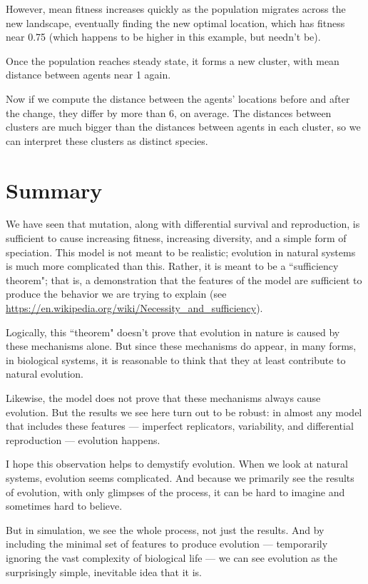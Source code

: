 \documentclass[12pt]{book}
\theoremstyle{exercise}
\begin{document}
However, mean fitness increases quickly as the population migrates across the new landscape, eventually finding the new optimal location, which has fitness near 0.75 (which happens to be higher in this example, but needn't be).

Once the population reaches steady state, it forms a new cluster, with mean distance between agents near 1 again.

Now if we compute the distance between the agents' locations before and after the change, they differ by more than 6, on average.  The distances between clusters are much bigger than the distances between agents in each cluster, so we can interpret these clusters as distinct species.


\section{Summary}

We have seen that mutation, along with differential survival and reproduction, is sufficient to cause increasing fitness, increasing diversity, and a simple form of speciation.  This model is not meant to be realistic; evolution in natural systems is much more complicated than this.  Rather, it is meant to be a ``sufficiency theorem"; that is, a demonstration that the features of the model are sufficient to produce the behavior we are trying to explain (see \url{https://en.wikipedia.org/wiki/Necessity_and_sufficiency}).

Logically, this ``theorem" doesn't prove that evolution in nature is caused by these mechanisms alone.  But since these mechanisms do appear, in many forms, in biological systems, it is reasonable to think that they at least contribute to natural evolution.

Likewise, the model does not prove that these mechanisms always cause evolution.  But the results we see here turn out to be robust: in almost any model that includes these features --- imperfect replicators, variability, and differential reproduction --- evolution happens.

I hope this observation helps to demystify evolution.  When we look at natural systems, evolution seems complicated.  And because we primarily see the results of evolution, with only glimpses of the process, it can be hard to imagine and sometimes hard to believe.

But in simulation, we see the whole process, not just the results.  And by including the minimal set of features to produce evolution --- temporarily ignoring the vast complexity of biological life --- we can see evolution as the surprisingly simple, inevitable idea that it is.
\end{document}
